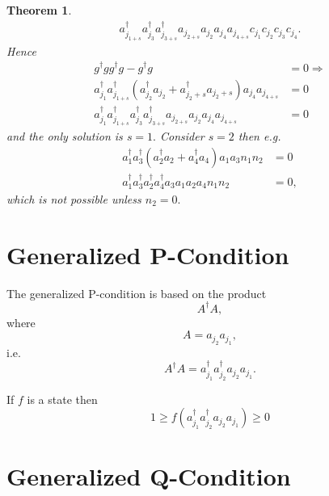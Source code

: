 \documentclass[aps,preprint]{revtex4}%
\newtheorem{theorem}{Theorem}
\begin{document}
\begin{theorem}
\begin{align}
{}a_{j_{1+s}}^{\dagger}a_{j_{3}}^{\dagger}a_{j_{3+s}}^{\dagger}a_{j_{2+s}%
}a_{j_{2}}a_{j_{4}}a_{j_{4+s}}c_{j_{1}}c_{j_{2}}c_{j_{3}}c_{j_{4}}.
\end{align}
Hence
\begin{align}
g^{\dagger}gg^{\dagger}g-g^{\dagger}g  &  =0\Rightarrow\nonumber\\
a_{j_{1}}^{\dagger}a_{j_{1+s}}^{\dagger}\left(  a_{j_{2}}^{\dagger}a_{j_{2}%
}+a_{j_{2}+s}^{\dagger}a_{j_{2}+s}\right)  a_{j_{4}}a_{j_{4+s}}  &
=0\nonumber\\
a_{j_{1}}^{\dagger}a_{j_{1+s}}^{\dagger}a_{j_{3}}^{\dagger}a_{j_{3+s}%
}^{\dagger}a_{j_{2+s}}a_{j_{2}}a_{j_{4}}a_{j_{4+s}}  &  =0
\end{align}
and the only solution is $s=1.$ Consider $s=2$ then e.g.%
\begin{align}
a_{1}^{\dagger}a_{3}^{\dagger}\left(  a_{2}^{\dagger}a_{2}+a_{4}^{\dagger
}a_{4}\right)  a_{1}a_{3}n_{1}n_{2}  &  =0\nonumber\\
a_{1}^{\dagger}a_{3}^{\dagger}a_{2}^{\dagger}a_{4}^{\dagger}a_{3}a_{1}%
a_{2}a_{4}n_{1}n_{2}  &  =0,
\end{align}
which is not possible unless $n_{2}=0.$
\end{theorem}

\section{Generalized P-Condition}

The generalized P-condition is based on the product
\begin{equation}
A^{\dagger}A,
\end{equation}
where
\begin{equation}
A=a_{j_{2}}a_{j_{1}},
\end{equation}
i.e.%
\begin{equation}
A^{\dagger}A=a_{j_{1}}^{\dagger}a_{j_{2}}^{\dagger}a_{j_{2}}a_{j_{1}}.
\end{equation}


If $f$ is a state then%
\begin{equation}
1\geq f\left(  a_{j_{1}}^{\dagger}a_{j_{2}}^{\dagger}a_{j_{2}}a_{j_{1}%
}\right)  \geq0
\end{equation}


\section{Generalized Q-Condition}
\end{document}
